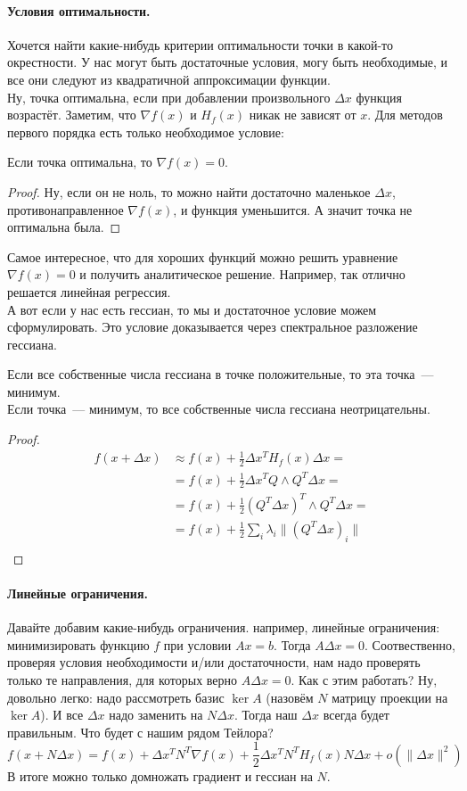 \documentclass{article}
\begin{document}
    \paragraph{Условия оптимальности.}
    Хочется найти какие-нибудь критерии оптимальности точки в какой-то окрестности. У нас могут быть достаточные условия, могу быть необходимые, и все они следуют из квадратичной аппроксимации функции.\\
    Ну, точка оптимальна, если при добавлении произвольного $\Delta x$ функция возрастёт. Заметим, что $\nabla f(x)$ и $H_f(x)$ никак не зависят от $x$. Для методов первого порядка есть только необходимое условие:
    \begin{theorem}
        Если точка оптимальна, то $\nabla f(x)=0$.
    \end{theorem}
    \begin{proof}
        Ну, если он не ноль, то можно найти достаточно маленькое $\Delta x$, противонаправленное $\nabla f(x)$, и функция уменьшится. А значит точка не оптимальна была.
    \end{proof}\noindent
    Самое интересное, что для хороших функций можно решить уравнение $\nabla f(x)=0$ и получить аналитическое решение. Например, так отлично решается линейная регрессия.\\
    А вот если у нас есть гессиан, то мы и достаточное условие можем сформулировать. Это условие доказывается через спектральное разложение гессиана.
    \begin{theorem}
        Если все собственные числа гессиана в точке положительные, то эта точка~--- минимум.\\
        Если точка~--- минимум, то все собственные числа гессиана неотрицательны.
    \end{theorem}
    \begin{proof}
        \[\begin{split}
            f(x+\Delta x)&\approx f(x)+\frac12\Delta x^TH_f(x)\Delta x=\\
            &=f(x)+\frac12\Delta x^TQ\land Q^T\Delta x=\\
            &=f(x)+\frac12(Q^T\Delta x)^T\land Q^T\Delta x=\\
            &=f(x)+\frac12\sum\limits_i\lambda_i\|(Q^T\Delta x)_i\|\\
        \end{split}\]
    \end{proof}\noindent
    \paragraph{Линейные ограничения.}
    Давайте добавим какие-нибудь ограничения. например, линейные ограничения: минимизировать функцию $f$ при условии $Ax=b$. Тогда $A\Delta x=0$. Соотвественно, проверяя условия необходимости и/или достаточности, нам надо проверять только те направления, для которых верно $A\Delta x=0$. Как с этим работать? Ну, довольно легко: надо рассмотреть базис $\ker A$ (назовём $N$ матрицу проекции на $\ker A$). И все $\Delta x$ надо заменить на $N\Delta x$. Тогда наш $\Delta x$ всегда будет правильным. Что будет с нашим рядом Тейлора?
    \[
    f(x+N\Delta x)=f(x)+\Delta x^TN^T\nabla f(x)+\frac12\Delta x^TN^TH_f(x)N\Delta x+o(\|\Delta x\|^2)
    \]
    В итоге можно только домножать градиент и гессиан на $N$.
\end{document}
